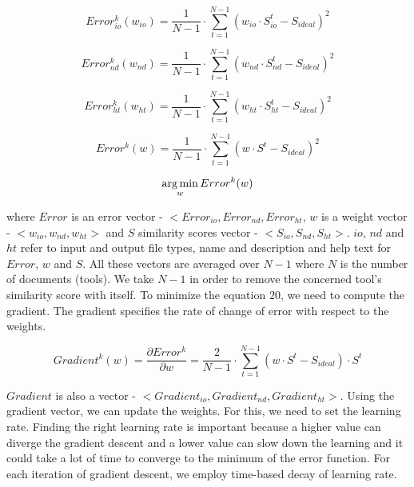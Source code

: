 \begin{equation}
Error^k_{io}(w_{io}) = \frac{1}{N - 1} \cdot \sum_{t=1}^{N-1} (w_{io} \cdot S^t_{io} - S_{ideal}) ^ 2
\end{equation}

\begin{equation}
Error^k_{nd}(w_{nd}) = \frac{1}{N - 1} \cdot \sum_{t=1}^{N-1} (w_{nd} \cdot S^t_{nd} - S_{ideal}) ^ 2
\end{equation}

\begin{equation}
Error^k_{ht}(w_{ht}) =  \frac{1}{N - 1} \cdot \sum_{t=1}^{N-1} (w_{ht} \cdot S^t_{ht} - S_{ideal}) ^ 2
\end{equation}

\begin{equation}
Error^k(w) =  \frac{1}{N - 1} \cdot \sum_{t=1}^{N-1} (w \cdot S^t - S_{ideal}) ^ 2
\end{equation}

\begin{equation}
\operatorname*{arg\,min}_w Error^k(w) 
\end{equation} 

where $Error$ is an error vector - $<Error_{io}, Error_{nd}, Error_{ht}$, $w$ is a weight vector - $<w_{io}, w_{nd}, w_{ht}>$ and $S$ similarity scores vector - $<S_{io}, S_{nd}, S_{ht}>$. $io$, $nd$ and $ht$ refer to input and output file types, name and description and help text for $Error$, $w$ and $S$. All these vectors are averaged over $N-1$ where $N$ is the number of documents (tools). We take $N-1$ in order to remove the concerned tool's similarity score with itself. To minimize the equation $20$, we need to compute the gradient. The gradient specifies the rate of change of error with respect to the weights.

\begin{equation}
Gradient^k(w) = \frac{\partial Error^k}{\partial w} =  \frac{2}{N - 1} \cdot \sum_{t=1}^{N-1} (w \cdot S^t - S_{ideal}) \cdot S^t
\end{equation}

$Gradient$ is also a vector - $<Gradient_{io}, Gradient_{nd}, Gradient_{ht}>$. Using the gradient vector, we can update the weights. For this, we need to set the learning rate. Finding the right learning rate is important because a higher value can diverge the gradient descent and a lower value can slow down the learning and it could take a lot of time to converge to the minimum of the error function. For each iteration of gradient descent, we employ time-based decay of learning rate.

